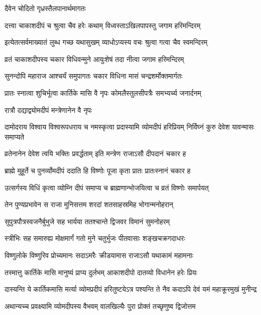 \onelineshloka
{दैवेन चोदितो गृध्रस्तैलपानार्थमागतः} %

\twolineshloka
{दत्त्वा चाकाशदीपं च श्रुत्वा चैव हरेः कथाम्}
{विध्वस्ताऽखिलपापस्तु जगाम हरिमन्दिरम्} %

\twolineshloka
{इत्येतत्सर्वमाख्यातं लुब्ध गच्छ यथासुखम्}
{व्याधोऽप्यस्य वचः श्रुत्वा गत्वा चैव स्वमन्दिरम्} %

\twolineshloka
{व्रतं चाकाशदीपस्य चकार विधिवन्मुने}
{आयुःशेषं तदा नीत्वा जगाम हरिमन्दिरम्} %

\twolineshloka
{सुनन्दोपि महाराज आश्चर्यं समुपागतः}
{चकार विधिना मासं चन्द्रशर्मोक्तमार्गतः} %

\twolineshloka
{प्रातः स्नात्वा शुचिर्भूत्वा कार्तिके मासि वै नृपः}
{कोमलैस्तुलसीपत्रैः समभ्यर्च्य जनार्दनम्} %


\onelineshloka
{रात्रौ दद्याद्व्योमदीपं मन्त्रेणानेन वै नृपः} %

\threelineshloka
{दामोदराय विश्वाय विश्वरूपधराय च}
{नमस्कृत्वा प्रदास्यामि व्योमदीपं हरिप्रियम्}
{निर्विघ्नं कुरु देवेश यावन्मासः समाप्यते} %

\twolineshloka
{व्रतेनानेन देवेश त्वयि भक्तिः प्रवर्द्धताम्}
{इति मन्त्रेण राजाऽसौ दीपदानं चकार ह} %

\twolineshloka
{ब्राह्मे मुहूर्ते च पुनर्व्योमदीपं ददाति हि}
{विष्णोः पूजा कृता प्रातः प्रातःस्नानं चकार ह} %

\twolineshloka
{उत्सर्गस्य विधिं कृत्वा व्योम्नि दीपं समाप्य च}
{ब्राह्मणान्भोजयित्वा च व्रतं विष्णोः समार्पयत्} %

\twolineshloka
{तेन पुण्यप्रभावेन स राजा मुनिसत्तम}
{शरदां शतसाहस्रमिह भोगान्मनोहरान्} %

\twolineshloka
{सुपुत्रपौत्रस्वजनैर्बुभुजे सह भार्यया}
{ततश्चान्ते द्विजवर विमानं सुमनोहरम्} %

\twolineshloka
{स्त्रीभिः सह समारुह्य मोक्षमार्गं गतो मुने}
{चतुर्भुजः पीतवासाः शङ्खचक्रगदाधरः} %

\twolineshloka
{विष्णुलोके विष्णुरिव प्रोच्यमानः सदाऽमरैः}
{क्रीडयामास राजाऽसौ यथाकामं महामनाः} %

\twolineshloka
{तस्मात्तु कार्तिके मासि मानुष्यं प्राप्य दुर्लभम्}
{आकाशदीपो दातव्यो विधानेन हरेः प्रियः} %

\fourlineindentedshloka
{दास्यन्ति ये कार्तिकमासि मर्त्या}
{व्योमप्रदीपं हरितुष्टयेऽत्र}
{पश्यन्ति ते नैव कदाऽपि देवं}
{यमं महाक्रूरमुखं मुनीन्द्र} %

\twolineshloka
{अथान्यच्च प्रवक्ष्यामि व्योमदीपस्य वैभवम्}
{वालखिल्यैः पुरा प्रोक्तं तच्छृणुष्व द्विजोत्तम} %


